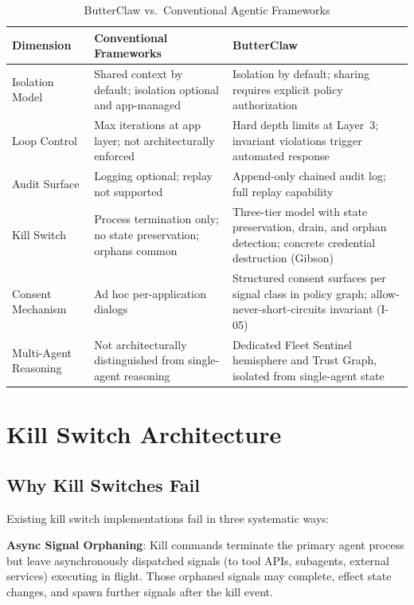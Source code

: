 \documentclass[11pt,a4paper]{article}
\begin{document}
\begin{table}[htbp]
  \centering\small
  \caption{ButterClaw vs.\ Conventional Agentic Frameworks}
  \label{tab:comparison}
  \begin{tabularx}{\linewidth}{L{2.8cm} L{5.2cm} L{5cm}}
    \toprule
    \textbf{Dimension} & \textbf{Conventional Frameworks} & \textbf{ButterClaw} \\
    \midrule
    Isolation Model    & Shared context by default; isolation optional and app-managed & Isolation by default; sharing requires explicit policy authorization \\
    Loop Control       & Max iterations at app layer; not architecturally enforced & Hard depth limits at Layer~3; invariant violations trigger automated response \\
    Audit Surface      & Logging optional; replay not supported & Append-only chained audit log; full replay capability \\
    Kill Switch        & Process termination only; no state preservation; orphans common & Three-tier model with state preservation, drain, and orphan detection; concrete credential destruction (Gibson) \\
    Consent Mechanism  & Ad hoc per-application dialogs & Structured consent surfaces per signal class in policy graph; allow-never-short-circuits invariant (I-05) \\
    Multi-Agent Reasoning & Not architecturally distinguished from single-agent reasoning & Dedicated Fleet Sentinel hemisphere and Trust Graph, isolated from single-agent state \\
    \bottomrule
  \end{tabularx}
\end{table}

\section{Kill Switch Architecture}
\label{sec:killswitch}

\subsection{Why Kill Switches Fail}

Existing kill switch implementations fail in three systematic ways:

\textbf{Async Signal Orphaning}: Kill commands terminate the primary agent process but leave
asynchronously dispatched signals (to tool APIs, subagents, external services) executing in
flight. Those orphaned signals may complete, effect state changes, and spawn further signals
after the kill event.
\end{document}
